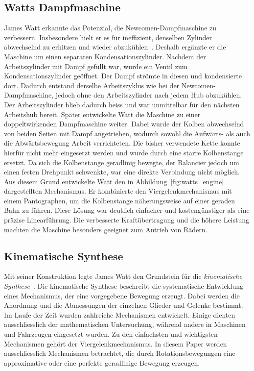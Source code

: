 \subsection{Watts Dampfmaschine\label{geradlinig:subsection:watts_steam}}
James Watt erkannte das Potenzial, die Newcomen-Dampfmaschine zu verbessern.
%
Insbesondere hielt er es für ineffizient, 
denselben Zylinder abwechselnd zu erhitzen 
und wieder abzukühlen~\cite{wiki_watt_steam}.
Deshalb ergänzte er die Maschine um einen separaten Kondensationszylinder.
Nachdem der Arbeitszylinder mit Dampf gefüllt war, 
wurde ein Ventil zum Kondensationszylinder geöffnet.
Der Dampf strömte in diesen und kondensierte dort.
Dadurch entstand derselbe Arbeitszyklus wie bei der 
Newcomen-Dampfmaschine, jedoch ohne den Arbeitszylinder nach jedem Hub abzukühlen.
Der Arbeitszylinder blieb dadurch heiss und war unmittelbar 
für den nächsten Arbeitshub bereit.
Später entwickelte Watt die Maschine zu einer doppeltwirkenden Dampfmaschine weiter.
Dabei wurde der Kolben abwechselnd von beiden Seiten mit Dampf angetrieben,
wodurch sowohl die Aufwärts- als auch die Abwärtsbewegung 
Arbeit verrichteten.
Die bisher verwendete Kette konnte hierfür nicht mehr 
eingesetzt werden und wurde durch eine starre Kolbenstange ersetzt.
Da sich die Kolbenstange geradlinig bewegte, der Balancier
jedoch um einen festen Drehpunkt schwenkte, 
war eine direkte Verbindung nicht möglich.
Aus diesem Grund entwickelte Watt den in 
Abbildung~\ref{fig:watts_engine} dargestellten Mechanismus.
Er kombinierte den Viergelenkmechanismus mit einem Pantographen, 
%
um die Kolbenstange näherungsweise auf einer geraden Bahn zu führen.
%
Diese Lösung war deutlich einfacher und kostengünstiger 
als eine präzise Linearführung.
Die verbesserte Kraftübertragung und die höhere Leistung machten 
die Maschine besonders geeignet zum Antrieb von Rädern.


\subsection{Kinematische Synthese
\label{geradlinig:subsection:kinematische_synthese}}
%
Mit seiner Konstruktion legte James Watt den Grundstein 
für die \emph{kinematische Synthese}~\cite{kin_synth}.
Die kinematische Synthese beschreibt die systematische Entwicklung 
eines Mechanismus, der eine vorgegebene Bewegung erzeugt.
Dabei werden die Anordnung und die Abmessungen der 
einzelnen Glieder und Gelenke bestimmt.
Im Laufe der Zeit wurden zahlreiche Mechanismen entwickelt.
Einige dienten ausschliesslich der mathematischen Untersuchung, 
während andere in Maschinen und Fahrzeugen eingesetzt wurden.
Zu den einfachsten und wichtigsten Mechanismen 
gehört der Viergelenkmechanismus.
In diesem Paper werden ausschliesslich Mechanismen betrachtet, 
die durch Rotationsbewegungen eine approximative oder 
eine perfekte geradlinige Bewegung erzeugen.
